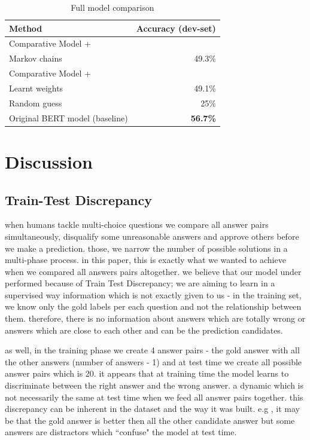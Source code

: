 \documentclass{article}
\begin{document}
\begin{table}[h!]
	\label{tbl:accuracy}
	\vskip 0.15in
	\begin{center}
		\begin{small}
			\begin{sc}
				\begin{tabular}{lr}
					\toprule
					Method	& Accuracy (dev-set)\\
					\midrule
					Comparative Model + \\ \qquad \qquad Markov chains 	& 49.3\% \\
					Comparative Model + \\ \qquad \qquad Learnt weights 	& 49.1\% \\
					\midrule
					Random guess & 25\% \\
					Original BERT model (baseline) & \textbf{56.7\%} \\
					\bottomrule
				\end{tabular}
			\end{sc}
		\end{small}
	\end{center}
	\vskip -0.1in
	\caption{Full model comparison}
\end{table}

\section{Discussion}
\subsection{Train-Test Discrepancy}
when humans tackle multi-choice questions we compare all answer pairs simultaneously, disqualify some unreasonable answers and approve others before we make a prediction. those, we narrow the number of possible solutions in a multi-phase process. in this paper, this is exactly what we wanted to achieve when we compared all answers pairs altogether. we believe that our model under performed because of Train Test Discrepancy; we are aiming to learn in a supervised way information which is not exactly given to us - in the training set, we know only the gold labels per each question and not the relationship between them. therefore, there is no information about answers which are totally wrong or answers which are close to each other and can be the prediction candidates. 

as well, in the training phase we create 4 answer pairs - the gold answer with all the other answers (number of answers - 1) and at test time we create all possible answer pairs which is 20. it appears that at training time the model learns to discriminate between the right answer and the wrong answer. a dynamic which is not necessarily the same at test time when we feed all answer pairs together. this discrepancy can be inherent in the dataset and the way it was built. e.g , it may be that the gold answer is better then all the other candidate answer but some answers are distractors which ``confuse" the model at test time.
\end{document}
